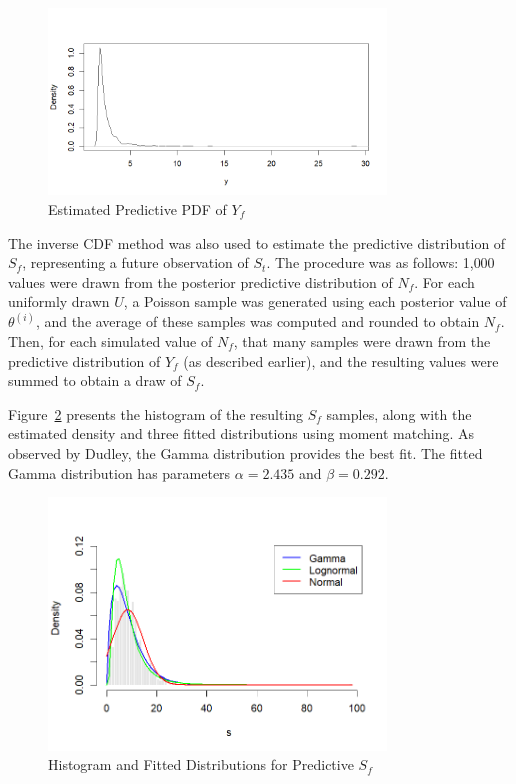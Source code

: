\documentclass{Class/julia}
\begin{document}
\begin{figure}[!ht]
\centering
\includegraphics[width=0.8\textwidth]{rytgaard1990/predictive_Y_f.png}
\caption{Estimated Predictive PDF of \( Y_f \)}
\label{fig:9}
\end{figure}

The inverse CDF method was also used to estimate the predictive distribution of \( S_f \), representing a future observation of \( S_t \). The procedure was as follows: 1{,}000 values were drawn from the posterior predictive distribution of \( N_f \). For each uniformly drawn \( U \), a Poisson sample was generated using each posterior value of \( \theta^{(i)} \), and the average of these samples was computed and rounded to obtain \( N_f \). Then, for each simulated value of \( N_f \), that many samples were drawn from the predictive distribution of \( Y_f \) (as described earlier), and the resulting values were summed to obtain a draw of \( S_f \).

Figure~\ref{fig:10} presents the histogram of the resulting \( S_f \) samples, along with the estimated density and three fitted distributions using moment matching. As observed by Dudley, the Gamma distribution provides the best fit. The fitted Gamma distribution has parameters \( \alpha = 2.435 \) and \( \beta = 0.292 \).

\begin{figure}[!ht]
\centering
\includegraphics[width=0.8\textwidth]{rytgaard1990/predictive_S_f.png}
\caption{Histogram and Fitted Distributions for Predictive \( S_f \)}
\label{fig:10}
\end{figure}
\end{document}
